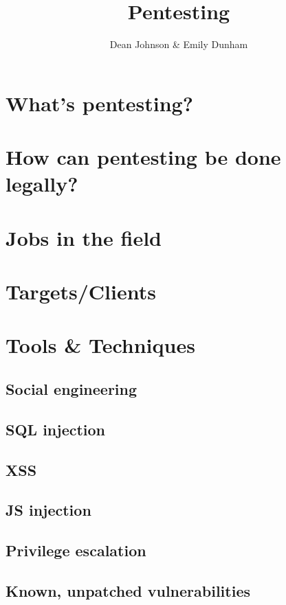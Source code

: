 \documentclass{article}
\title{Pentesting}
\author{Dean Johnson \& Emily Dunham}
\begin{document}
\maketitle
\section{What's pentesting? }


\section{How can pentesting be done legally?}

\section{Jobs in the field} 

\section{Targets/Clients}

\section{Tools \& Techniques}

\subsection{Social engineering}

\subsection{SQL injection}

\subsection{XSS}

\subsection{JS injection}

\subsection{Privilege escalation}

\subsection{Known, unpatched vulnerabilities}
\end{document}
